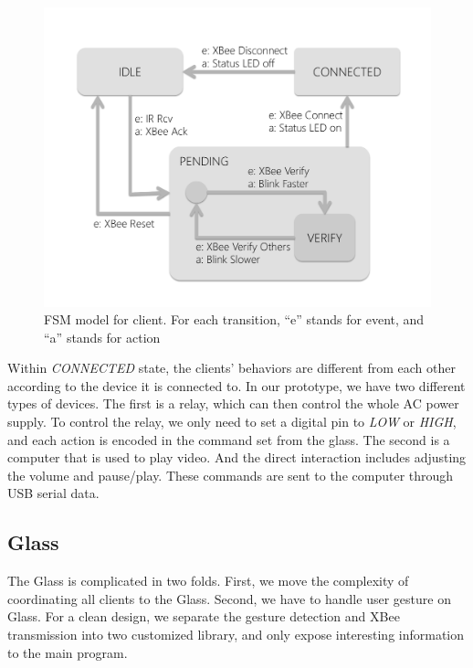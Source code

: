 \begin{figure}
  \centering
  \includegraphics[width=\linewidth]{../figs/clientFSM.pdf}
  \caption{FSM model for client. For each transition, ``e'' stands for event, and ``a'' stands for action}
  \label{fig:clientFSM}
\end{figure}

Within {\it CONNECTED} state, the clients' behaviors are different from each other according to the device it is connected to. In our prototype, we have two different types of devices. The first is a relay, which can then control the whole AC power supply. To control the relay, we only need to set a digital pin to {\it LOW} or {\it HIGH}, and each action is encoded in the command set from the glass. The second is a computer that is used to play video. And the direct interaction includes adjusting the volume and pause/play. These commands are sent to the computer through USB serial data.

\subsection{Glass}
\label{sec:glass}

The Glass is complicated in two folds. First, we move the complexity of coordinating all clients to the Glass. Second, we have to handle user gesture on Glass. For a clean design, we separate the gesture detection and XBee transmission into two customized library, and only expose interesting information to the main program.

